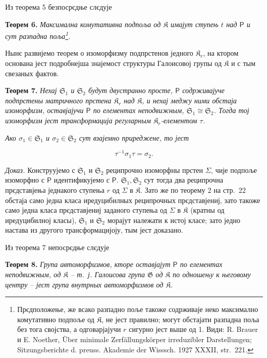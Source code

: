 \documentclass[11pt]{article}
\newcommand{\srcfn}[2]{\footnote{#2}}
\newcommand{\foreign}[1]{#1}
\begin{document}
Из теорема 5 безпосрєдње слєдује

\textbf{Теорем 6.} \emph{Максимална комутативна подпоља од \(\mathfrak K\) имајут ступењ \(t\) над \(\mathsf P\) и сут разпадна поља\srcfn{1}{Прєдположење, же всако разпадно поље такоже содрживаје неко максимално комутативно подпоље од \(\mathfrak K\), не јест правилно; могут обстајати разпадна поља без тога својства, а одговарјајучи \(r\) сигурно јест выше од 1. Види: \foreign{R. Brauer} и \foreign{E. Noether}, \foreign{Über minimale Zerfällungskörper irreduzibler Darstellungen; Sitzungsberichte d. preuss. Akademie der Wisssch. 1927 XXXII, str.~221.}}.}

Нынє развијемо теорем о изоморфизму подпрстенов једного \(\mathfrak K_r\), на ктором основана јест подробнејша знајемост структуры Галоисовој групы од \(\mathfrak K\) и с тым свезаных фактов.

\textbf{Теорем 7.} \emph{Нехај \(\mathfrak S_1\) и \(\mathfrak S_2\) будут двустранно просте, \(\mathsf P\) содрживајуче подпрстены матричного прстена \(\mathfrak K_r\) над \(\mathfrak K\), и нехај меджу ними обстаја изоморфизм, оставјајучи \(\mathsf P\) по елементах неподвижным, \(\mathfrak S_1\cong\mathfrak S_2\). Тогда тој изоморфизм јест трансформација регуларным \(\mathfrak K_r\)-елементом \(\tau\).}

\emph{Ако \(\sigma_1\in\mathfrak S_1\) и \(\sigma_2\in\mathfrak S_2\) сут взајемно приреджене, то јест}

\[
\tau^{-1}\sigma_1\tau=\sigma_2.
\]

\emph{Доказ.} Конструујемо с \(\mathfrak S_1\) и \(\mathfrak S_2\) реципрочно изоморфны прстен \(\Sigma\), чије подпоље изоморфно с \(\mathsf P\) идентификујемо с \(\mathsf P\). \(\mathfrak S_1,\mathfrak S_2\) сут тогда два реципрочна прєдставјења једнакого ступења \(r\) од \(\Sigma\) в \(\mathfrak K\). Зато же по теорему 2 на стр.~22 обстаја само једна класа иредуцибилных реципрочных прєдставјениј, зато такоже само једна класа прєдставјениј заданого ступења од \(\Sigma\) в \(\mathfrak K\) (кратны од иредуцибилној класы), \(\mathfrak S_1\) и \(\mathfrak S_2\) морајут належати к истој класе; зато једно настава из другого трансформацијоју, тым јест доказано.

Из теорема 7 непосрєдње слєдује

\textbf{Теорем 8.} \emph{Група автоморфизмов, кторе оставјајут \(\mathsf P\) по елементах неподвижным, од \(\mathfrak K\) -- т.~ј. Галоисова група \(\mathfrak G\) од \(\mathfrak K\) по одношењу к његовому центру -- јест група внутрных автоморфизмов од \(\mathfrak K\).}
\end{document}
